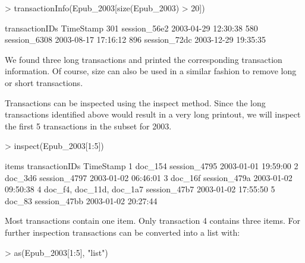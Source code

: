 \documentclass[10pt,a4paper]{article}
\begin{document}
\begin{Schunk}
\begin{Sinput}
> transactionInfo(Epub_2003[size(Epub_2003) > 20])
\end{Sinput}
\begin{Soutput}
    transactionIDs           TimeStamp
301   session_56e2 2003-04-29 12:30:38
580   session_6308 2003-08-17 17:16:12
896   session_72dc 2003-12-29 19:35:35

\end{Soutput}
\end{Schunk}

We found three long transactions and printed the corresponding
transaction information. Of course, size can also be used in a similar
fashion to remove long or short transactions.

Transactions can be inspected using the inspect method. 
Since the long transactions identified above would result in
a very long printout, we will inspect 
the first 5 transactions in the subset for 2003.

\begin{Schunk}
\begin{Sinput}
> inspect(Epub_2003[1:5])
\end{Sinput}
\begin{Soutput}
  items     transactionIDs           TimeStamp
1 {doc_154}   session_4795 2003-01-01 19:59:00
2 {doc_3d6}   session_4797 2003-01-02 06:46:01
3 {doc_16f}   session_479a 2003-01-02 09:50:38
4 {doc_f4,                                    
   doc_11d,                                   
   doc_1a7}   session_47b7 2003-01-02 17:55:50
5 {doc_83}    session_47bb 2003-01-02 20:27:44

\end{Soutput}
\end{Schunk}

Most transactions contain one item. Only transaction 4 contains three items. 
For further inspection transactions can be converted into a list with:

\begin{Schunk}
\begin{Sinput}
> as(Epub_2003[1:5], "list")
\end{Sinput}
\end{Schunk}
\end{document}
